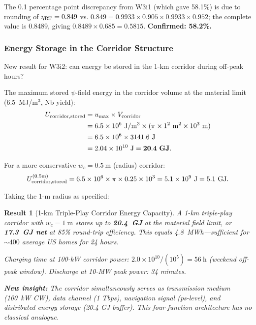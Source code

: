 \documentclass[aps,prd,twocolumn,superscriptaddress]{revtex4-2}
\newtheorem{result}{Result}
\begin{document}
The 0.1 percentage point discrepancy from W3i1 (which gave 58.1\%) is
due to rounding of $\eta_{\rm RT} = 0.849$ vs. $0.849 = 0.9933\times 0.905
\times 0.9933\times 0.952$; the complete value is 0.8489, giving
$0.8489\times 0.685 = 0.5815$.  \textbf{Confirmed: 58.2\%.}

\subsubsection{Energy Storage in the Corridor Structure}

New result for W3i2: can energy be stored in the 1-km corridor during
off-peak hours?

The maximum stored $\psi$-field energy in the corridor volume at the
material limit (6.5~MJ/m$^3$, Nb yield):
\begin{align}
U_{\rm corridor,stored} &= u_{\rm max}\times V_{\rm corridor} \notag\\
&= 6.5\times 10^6~\mathrm{J/m^3}
\times(\pi\times 1^2~\mathrm{m^2}\times 10^3~\mathrm{m}) \notag\\
&= 6.5\times 10^6\times 3141.6~\mathrm{J} \notag\\
&= 2.04\times 10^{10}~\mathrm{J} = \mathbf{20.4~GJ}.
\end{align}

For a more conservative $w_c = 0.5~\mathrm{m}$ (radius) corridor:
\begin{equation}
U_{\rm corridor,stored}^{(0.5\mathrm{m})} = 6.5\times 10^6\times\pi\times 0.25\times 10^3
= 5.1\times 10^9~\mathrm{J} = 5.1~\mathrm{GJ}.
\end{equation}

Taking the 1-m radius as specified:

\begin{result}[1-km Triple-Play Corridor Energy Capacity]
A 1-km triple-play corridor with $w_c = 1~\mathrm{m}$ stores up to
\textbf{20.4~GJ} at the material field limit, or
\textbf{17.3~GJ net} at 85\% round-trip efficiency.
This equals 4.8~MWh---sufficient for $\sim 400$ average US homes
for 24 hours.

Charging time at 100-kW corridor power: $2.0\times 10^{10}/(10^5) = 56~\mathrm{h}$
(weekend off-peak window).
Discharge at 10-MW peak power: 34 minutes.

\textbf{New insight:}  The corridor simultaneously serves as
transmission medium (100~kW CW), data channel (1 Tbps), navigation
signal (ps-level), and distributed energy storage (20.4 GJ buffer).
This four-function architecture has no classical analogue.
\end{result}
\end{document}
